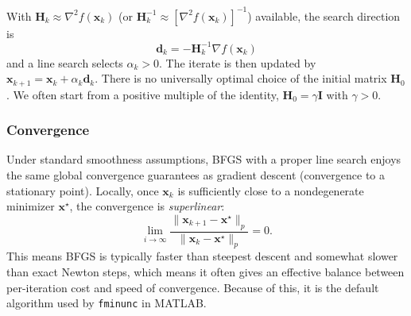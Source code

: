 With \(\mathbf{H}_k \approx \nabla^2 f(\mathbf{x}_k)\) (or \(\mathbf{H}_k^{-1} \approx [\nabla^2 f(\mathbf{x}_k)]^{-1}\)) available, the search direction is
\begin{equation}
\mathbf{d}_k = -\mathbf{H}_k^{-1}\nabla f(\mathbf{x}_k)
\end{equation}
and a line search selects \(\alpha_k>0\). The iterate is then updated by \(\mathbf{x}_{k+1}=\mathbf{x}_k+\alpha_k\mathbf{d}_k\). There is no universally optimal choice of the initial matrix \(\mathbf{H}_0\). We often start from a positive multiple of the identity, \(\mathbf{H}_0=\gamma\mathbf{I}\) with \(\gamma>0\).

\subsubsection{Convergence}
Under standard smoothness assumptions, BFGS with a proper line search enjoys the same global convergence guarantees as gradient descent (convergence to a stationary point). Locally, once \(\mathbf{x}_k\) is sufficiently close to a nondegenerate minimizer \(\mathbf{x}^\star\), the convergence is \emph{superlinear}:
\begin{equation}
\lim_{i\to\infty}
\frac{\|\mathbf{x}_{k+1}-\mathbf{x}^\star\|_p}{\|\mathbf{x}_k-\mathbf{x}^\star\|_p}=0.
\end{equation}
This means BFGS is typically faster than steepest descent and somewhat slower than exact Newton steps, which means it often gives an effective balance between per-iteration cost and speed of convergence. Because of this, it is the default algorithm used by \texttt{fminunc} in MATLAB.



